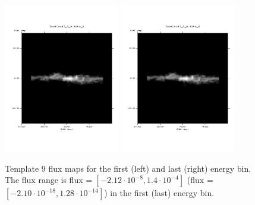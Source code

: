 \documentclass{article}
\begin{document}
\begin{figure}
\centering
\includegraphics[trim = 50 100 70 100, clip = true, width=0.45\textwidth]{figs/Template_maps/Template9_Ebin01}
\includegraphics[trim = 50 100 70 100, clip = true, width=0.45\textwidth]{figs/Template_maps/Template9_Ebin71}
\caption{Template 9 flux maps for the first (left) and last (right) energy bin. The flux range is flux = $[-2.12 \cdot 10^{-8}, 1.4 \cdot 10^{-4}]$ (flux = $[-2.10 \cdot 10^{-18}, 1.28 \cdot 10^{-14}]$) in the first (last) energy bin.}
\end{figure}
\end{document}
